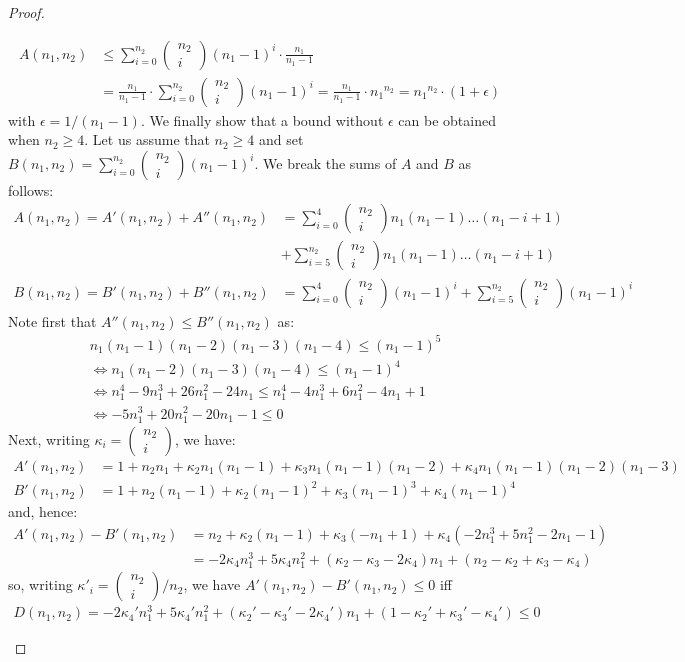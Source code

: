 \documentclass[10pt,a4paper]{article}
\theoremstyle{definition}
\theoremstyle{remark}
\newcommand\choice[2]{\left(\begin{matrix}{#1}\\{#2}\end{matrix}\right)}
\begin{document}
\begin{proof}
\begin{enumerate}
\begin{align*}
A(n_1,n_2) &\le \sum^{n_2}_{i = 0} 
		\choice{n_2}{i}
		(n_1-1)^i \cdot \frac{n_1}{n_1 - 1}
        \\ &
=  \frac{n_1}{n_1 - 1}\cdot\sum^{n_2}_{i = 0} 
		\choice{n_2}{i}
		(n_1-1)^i 
=  \frac{n_1}{n_1 - 1}\cdot {n_1}^{n_2}=  {n_1}^{n_2}\cdot (1 + \epsilon) 
      \end{align*}
      with $\epsilon=1/(n_1-1)$. We finally show that a bound without $\epsilon$ can be obtained when $n_2\ge 4$. Let us assume that $n_2\ge 4$ and set
      $B(n_1,n_2)=\sum^{n_2}_{i = 0} \choice{n_2}{i} (n_1-1)^i$. We break the sums of $A$ and $B$ as follows:
      \begin{align*}
        A(n_1,n_2) = A'(n_1,n_2)+A''(n_1,n_2) &=
\sum^{4}_{i = 0} \choice{n_2}{i} n_1(n_1 - 1)\dots(n_1 - i + 1)\\ & +
\sum^{n_2}_{i = 5} \choice{n_2}{i} n_1(n_1 - 1)\dots(n_1 - i + 1)\\
B(n_1,n_2) = B'(n_1,n_2)+B''(n_1,n_2) &=
\sum^{4}_{i = 0} \choice{n_2}{i} (n_1 - 1)^i+
\sum^{n_2}_{i = 5} \choice{n_2}{i} (n_1 - 1)^i
\end{align*}                                                
Note first that $A''(n_1,n_2)\leq B''(n_1,n_2)$ as:
\begin{align*}
& n_1(n_1-1)(n_1-2)(n_1-3)(n_1-4)\leq (n_1-1)^5\\
&\iff n_1(n_1-2)(n_1-3)(n_1-4)\leq (n_1-1)^4 \\
&\iff n_1^4-9n_1^3+26n_1^2-24n_1\leq n_1^4-4n_1^3+6n_1^2-4n_1+1\\
&\iff -5n_1^3+20n_1^2-20n_1-1\leq 0
\end{align*}
Next, writing $\kappa_i=\choice{n_2}{i}$, we have:
\begin{align*}
  A'(n_1,n_2) &= 1+n_2n_1+\kappa_2n_1(n_1-1)+\kappa_3n_1(n_1-1)(n_1-2)+\kappa_4n_1(n_1-1)(n_1-2)(n_1-3)\\
 B'(n_1,n_2) &= 1+n_2(n_1-1)+\kappa_2(n_1-1)^2+\kappa_3(n_1-1)^3+\kappa_4(n_1-1)^4
\end{align*}
and, hence:
\begin{align*}
  A'(n_1,n_2)-B'(n_1,n_2) &= n_2+\kappa_2(n_1-1)+\kappa_3(-n_1+1)+\kappa_4(-2n_1^3+5n_1^2-2n_1-1)\\
  &= -2\kappa_4n_1^3+5\kappa_4n_1^2+(\kappa_2-\kappa_3-2\kappa_4)n_1+(n_2-\kappa_2+\kappa_3-\kappa_4)
\end{align*}
so, writing $\kappa'_i=\choice{n_2}{i}/n_2$, we have $A'(n_1,n_2)-B'(n_1,n_2)\leq 0$ iff
\begin{align*}
D(n_1,n_2) = -2\kappa_4'n_1^3+5\kappa_4'n_1^2+(\kappa_2'-\kappa_3'-2\kappa_4')n_1+(1-\kappa_2'+\kappa_3'-\kappa_4')\leq0

\end{align*}
\end{enumerate}
\end{proof}
\end{document}
